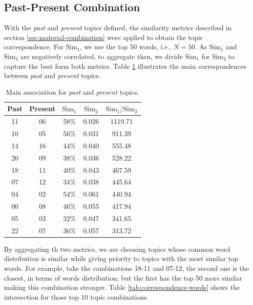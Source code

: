 \subsection{Past-Present Combination}

With the \textit{past} and \textit{present} topics defined, the similarity metrics described in section \ref{sec:material-combination} were applied to obtain the topic correspondence. For $\text{Sim}_{1}$, we use the top 50 words, i.e., $N=50$. As $\text{Sim}_{1}$ and $\text{Sim}_{2}$ are negatively correlated, to aggregate then, we divide $\text{Sim}_{1}$ for $\text{Sim}_{2}$ to capture the best form both metrics. Table \ref{tab:correspondence-score} illustrates the main correspondences between \textit{past} and \textit{present} topics.

\begin{table}[h!]
	\centering
	\caption{Main association for \textit{past} and \textit{present} topics.}
	\label{tab:correspondence-score}
	\begin{tabular}{cc|ccc}
		\toprule
		\textbf{Past} & \textbf{Present} & \textbf{$\text{Sim}_{1}$} & \textbf{$\text{Sim}_{2}$} & \textbf{$\text{Sim}_{1} / \text{Sim}_{2}$} \\ \midrule
		 11  &  06  & 58\% & 0.026 & 1119.71 \\
		 10  &  05  & 56\% & 0.031 & 911.39  \\
		 14  &  16  & 44\% & 0.040 & 555.48  \\
		 20  &  09  & 38\% & 0.036 & 528.22  \\
		 18  &  11  & 40\% & 0.043 & 467.59  \\
		 07  &  12  & 34\% & 0.038 & 445.64  \\
		 04  &  02  & 54\% & 0.061 & 440.94  \\
		 00  &  08  & 46\% & 0.055 & 417.94  \\
		 05  &  03  & 32\% & 0.047 & 341.65  \\
		 22  &  07  & 36\% & 0.057 & 313.72  \\ \bottomrule
	\end{tabular}
\end{table}

By aggregating th two metrics, we are choosing topics whose common word distribution is similar while giving priority to topics with the most similar top words. For example, take the combinations 18-11 and 07-12, the second one is the closest, in terms of words distribution, but the first has the top 50 more similar making this combination stronger. Table \ref{tab:correspondence-words} shows the intersection for those top 10 topic combinations.

